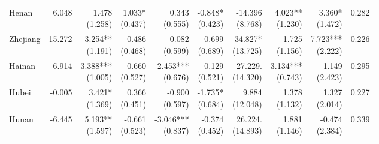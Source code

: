 \documentclass[12pt]{article}
\begin{document}
\begin{landscape}
\begin{small}
\begin{longtable}{lrrrrrrrrr}
    Henan & 6.048 & \makecell[r]{1.478\\(1.258)} & \makecell[r]{1.033*\\(0.437)} & \makecell[r]{0.343\\(0.555)} & \makecell[r]{-0.848*\\(0.423)} & \makecell[r]{-14.396\\(8.768)} & \makecell[r]{4.023**\\(1.230)} & \makecell[r]{3.360*\\(1.472)} & 0.282 \\
    Zhejiang & 15.272 & \makecell[r]{3.254**\\(1.191)} & \makecell[r]{0.486\\(0.468)} & \makecell[r]{-0.082\\(0.599)} & \makecell[r]{-0.699\\(0.689)} & \makecell[r]{-34.827*\\(13.725)} & \makecell[r]{1.725\\(1.156)} & \makecell[r]{7.723***\\(2.222)} & 0.226 \\
    Hainan & -6.914 & \makecell[r]{3.388***\\(1.005)} & \makecell[r]{-0.660\\(0.527)} & \makecell[r]{-2.453***\\(0.676)} & \makecell[r]{0.129\\(0.521)} & \makecell[r]{27.229.\\(14.320)} & \makecell[r]{3.134***\\(0.743)} & \makecell[r]{-1.149\\(2.423)} & 0.295 \\
    Hubei & -0.005 & \makecell[r]{3.421*\\(1.369)} & \makecell[r]{0.366\\(0.451)} & \makecell[r]{-0.900\\(0.597)} & \makecell[r]{-1.735*\\(0.684)} & \makecell[r]{9.884\\(12.048)} & \makecell[r]{1.378\\(1.132)} & \makecell[r]{1.327\\(2.014)} & 0.227 \\
    Hunan & -6.445 & \makecell[r]{5.193**\\(1.597)} & \makecell[r]{-0.661\\(0.523)} & \makecell[r]{-3.046***\\(0.837)} & \makecell[r]{-0.374\\(0.452)} & \makecell[r]{26.224.\\(14.893)} & \makecell[r]{1.881\\(1.146)} & \makecell[r]{-0.474\\(2.384)} & 0.339 \\

\end{longtable}
\end{small}
\end{landscape}
\end{document}
